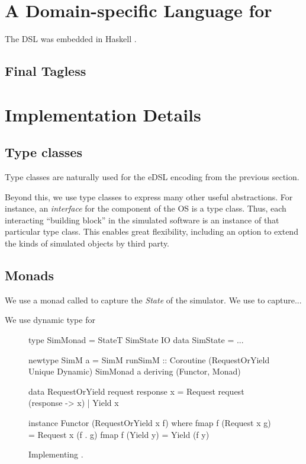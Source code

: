 \section{A Domain-specific Language for \soosim}
\label{sec:dsl}

The DSL was embedded in Haskell \cite{haskell-report}.

\subsection{Final Tagless}


\section{Implementation Details}
\label{sec:impl-detail}

\subsection{Type classes}

Type classes are naturally used for the eDSL encoding from the
previous section.  

Beyond this, we use type classes to express many
other useful abstractions. For instance, an \emph{interface} for the
component of the OS is a type class. Thus, each interacting ``building
block'' in the simulated software is an instance of that particular
type class. This enables great flexibility, including an option to
extend the kinds of simulated objects by third party.

\subsection{Monads}

We use a monad called  to capture the \emph{State}
 of the simulator. We use
 to capture...

We use dynamic type for 

\begin{figure}
\centering
\begin{code*}
type SimMonad  = StateT SimState IO
data SimState = ...

newtype SimM a 
  = SimM { runSimM :: Coroutine 
      (RequestOrYield Unique Dynamic) 
      SimMonad a }
    deriving (Functor, Monad)

data RequestOrYield request response x
  = Request request (response -> x)
  | Yield   x

instance Functor (RequestOrYield x f) where
  fmap f (Request x g) = Request x (f . g)
  fmap f (Yield y)     = Yield (f y)
\end{code*}
\caption{Implementing .}
\label{fig:code-simm}
\end{figure}

